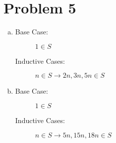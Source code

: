 \documentclass[11pt]{article}
\begin{document}
\section*{Problem 5}
	\begin{enumerate}[(a)]
	
	\item
	\begin{description}
		\item[Base Case:] $ 1 \in S $
		\item[Inductive Cases:] $n \in S \rightarrow 2n, 3n, 5n \in S$
	\end{description}
	
	\item
	\begin{description}
		\item[Base Case:] $ 1 \in S$
		\item[Inductive Cases:] $n \in S \rightarrow 5n, 15n, 18n \in S$
		
	\end{description}

	\end{enumerate}
	
\end{document}
